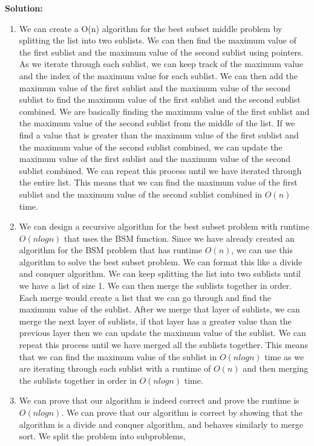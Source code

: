 \documentclass[12pt,letterpaper]{article}
\begin{document}
\textbf{Solution:}
\begin{enumerate}
    \item We can create a O(n) algorithm for the best subset middle problem by splitting the list into two sublists. 
    We can then find the maximum value of the first sublist and the maximum value of the second sublist using pointers.
    As we iterate through each sublist, we can keep track of the maximum value and the index of the maximum value for each sublist.
    We can then add the maximum value of the first sublist and the maximum value of the second sublist to find the maximum value of the
    first sublist and the second sublist combined. We are basically finding the maximum value of the first sublist and the maximum value of the second sublist
    from the middle of the list. If we find a value that is greater than the maximum value of the first sublist and the maximum value of the second sublist combined,
    we can update the maximum value of the first sublist and the maximum value of the second sublist combined. We can repeat this process until we have iterated
    through the entire list. This means that we can find the maximum value of the first sublist and the maximum value of the second sublist combined in $O(n)$ time.
    \item We can design a recursive algorithm for the best subset problem with runtime $O(n log n)$ that uses the BSM function. 
    Since we have already created an algorithm for the BSM problem that has runtime $O(n)$, we can use this algorithm to solve the best subset problem.
    We can format this like a divide and conquer algorithm. We can keep splitting the list into two sublists until we have a list of size 1.
    We can then merge the sublists together in order. Each merge would create a list that we can go through and find the maximum value of the sublist.
    After we merge that layer of sublists, we can merge the next layer of sublists, if that layer has a greater value than the previous layer then 
    we can update the maximum value of the sublist. We can repeat this process until we have merged all the sublists together. This means that we can find the maximum value of the sublist in $O(n log n)$ time
    as we are iterating through each sublist with a runtime of $O(n)$ and then merging the sublists together in order in $O(n log n)$ time.
    \item We can prove that our algorithm is indeed correct and prove the runtime is $O(n log n)$. We can prove that our algorithm is correct by
    showing that the algorithm is a divide and conquer algorithm, and behaves similarly to merge sort. We split the problem into subproblems,

\end{enumerate}
\end{document}
